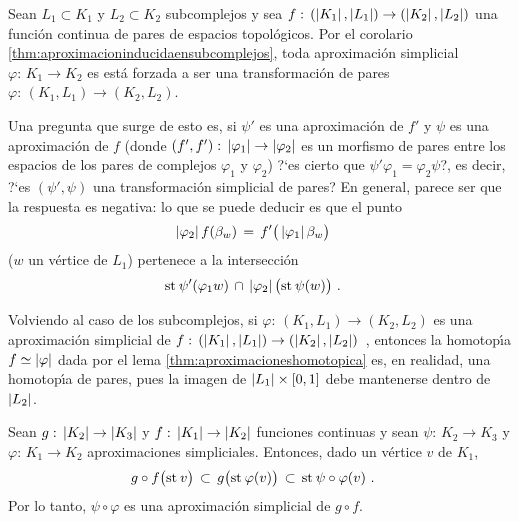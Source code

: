 \begin{obsAproximacionDeParesEsDePares}\label{obs:aproximaciondeparesesdepares}
	Sean $L_{1}\subset K_{1}$ y $L_{2}\subset K_{2}$ subcomplejos y
	sea
	\begin{math}
		f:\,(\left|K_{1}\right|,\left|L_{1}\right|)\rightarrow
			(\left|K_{2}\right|,\left|L_{2}\right|)
	\end{math}
	una funci\'{o}n continua de pares de espacios topol\'{o}gicos. Por
	el corolario \ref{thm:aproximacioninducidaensubcomplejos}, toda
	aproximaci\'{o}n simplicial $\varphi:\,K_{1}\rightarrow K_{2}$ es
	est\'{a} forzada a ser una transformaci\'{o}n de pares
	$\varphi:\,(K_{1},L_{1})\rightarrow (K_{2},L_{2})$.

	Una pregunta que surge de esto es, si $\psi'$ es una aproximaci\'{o}n
	de $f'$ y $\psi$ es una aproximaci\'{o}n de $f$ (donde
	$(f',f'):\,\left|\varphi_{1}\right|\rightarrow\left|\varphi_{2}\right|$ es un
	morfismo de pares entre los espacios de los pares de complejos
	$\varphi_{1}$ y $\varphi_{2}$) ?`es cierto que
	$\psi'\varphi_{1}=\varphi_{2}\psi$?, es decir, ?`es $(\psi',\psi)$ una
	transformaci\'{o}n simplicial de pares? En general, parece ser que
	la respuesta es negativa: lo que se puede deducir es que el punto
	\begin{align*}
		\left|\varphi_{2}\right|f(\beta_{w}) & \,=\,
			f'\big(\left|\varphi_{1}\right|\beta_{w}\big)
	\end{align*}
	($w$ un v\'{e}rtice de $L_{1}$) pertenece a la intersecci\'{o}n
	\begin{align*}
		& \mathrm{st}_{}\,\psi'(\varphi_{1}w)\,\cap\,
			\left|\varphi_{2}\right|\big(\mathrm{st}_{}\,\psi(w)\big)
		\text{ .}
	\end{align*}

	Volviendo al caso de los subcomplejos, si
	$\varphi:\,(K_{1},L_{1})\rightarrow (K_{2},L_{2})$ es una
	aproximaci\'{o}n simplicial de
	\begin{math}
		f:\,(\left|K_{1}\right|,\left|L_{1}\right|)\rightarrow
			(\left|K_{2}\right|,\left|L_{2}\right|)
	\end{math}~,
	entonces la homotop\'{\i}a $f\simeq\left|\varphi\right|$ dada por el lema
	\ref{thm:aproximacioneshomotopica} es, en realidad, una homotop\'{\i}a
	de pares, pues la imagen de $\left|L_{1}\right|\times\left[0,1\right]$ debe
	mantenerse dentro de $\left|L_{2}\right|$.
\end{obsAproximacionDeParesEsDePares}

\begin{obsComposicionDeAproximacionesEsAproximacion}%
	\label{obs:composiciondeaproximacionesesaproximacion}
	Sean $g:\,\left|K_{2}\right|\rightarrow\left|K_{3}\right|$ y
	$f:\,\left|K_{1}\right|\rightarrow\left|K_{2}\right|$ funciones continuas y sean
	$\psi:\,K_{2}\rightarrow K_{3}$ y $\varphi:\,K_{1}\rightarrow K_{2}$
	aproximaciones simpliciales. Entonces, dado un v\'{e}rtice $v$ de
	$K_{1}$,
	\begin{align*}
		g\circ f\big(\mathrm{st}_{}\,v\big) & \,\subset\,
			g\big(\mathrm{st}_{}\,\varphi(v)\big) \,\subset\,
			\mathrm{st}_{}\,\psi\circ\varphi(v)
		\text{ .}
	\end{align*}
	Por lo tanto, $\psi\circ\varphi$ es una aproximaci\'{o}n
	simplicial de $g\circ f$.
\end{obsComposicionDeAproximacionesEsAproximacion}


